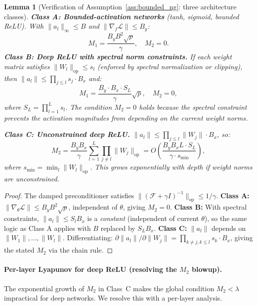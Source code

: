 \documentclass{article}
\providecommand{\FIM}{\mathcal{F}}
\providecommand{\norm}[1]{\lVert #1 \rVert}
\theoremstyle{plain}
\newtheorem{lemma}{Lemma}
\theoremstyle{definition}
\theoremstyle{remark}
\begin{document}
\begin{lemma}[Verification of Assumption~\ref{ass:bounded_ng}: three architecture classes]
\label{lem:verify}
\textbf{Class A: Bounded-activation networks} (tanh, sigmoid, bounded ReLU). With $\norm{a_l}_\infty \leq B$ and $\norm{\nabla_f\mathcal{L}} \leq B_y$:
\begin{equation}
    M_1 = \frac{B_y B^2 \sqrt{p}}{\gamma}, \quad M_2 = 0.
\end{equation}
\textbf{Class B: Deep ReLU with spectral norm constraints.} If each weight matrix satisfies $\norm{W_l}_{\mathrm{op}} \leq s_l$ (enforced by spectral normalization or clipping), then $\norm{a_l} \leq \prod_{j \leq l} s_j \cdot B_x$ and:
\begin{equation}
    M_1 = \frac{B_y \cdot B_x \cdot S_L}{\gamma}\sqrt{p}, \quad M_2 = 0,
\end{equation}
where $S_L = \prod_{l=1}^L s_l$. The condition $M_2 = 0$ holds because the spectral constraint prevents the activation magnitudes from depending on the \emph{current} weight norms.

\textbf{Class C: Unconstrained deep ReLU.} $\norm{a_l} \leq \prod_{j \leq l}\norm{W_j}\cdot B_x$, so:
\begin{equation}
    M_2 = \frac{B_y B_x}{\gamma}\sum_{l=1}^L \prod_{j \neq l}\norm{W_j}_{\mathrm{op}} = O\!\left(\frac{B_y B_x L \cdot S_L}{\gamma \cdot s_{\min}}\right),
\end{equation}
where $s_{\min} = \min_l \norm{W_l}_{\mathrm{op}}$. This grows exponentially with depth if weight norms are unconstrained.
\end{lemma}

\begin{proof}
The damped preconditioner satisfies $\norm{(\FIM + \gamma I)^{-1}}_{\mathrm{op}} \leq 1/\gamma$. \textbf{Class A:} $\norm{\nabla_\theta\mathcal{L}} \leq B_y B^2\sqrt{p}$, independent of $\theta$, giving $M_2 = 0$. \textbf{Class B:} With spectral constraints, $\norm{a_l} \leq S_l B_x$ is a \emph{constant} (independent of current $\theta$), so the same logic as Class A applies with $B$ replaced by $S_L B_x$. \textbf{Class C:} $\norm{a_l}$ depends on $\norm{W_1},\ldots,\norm{W_l}$. Differentiating: $\partial \norm{a_l}/\partial \norm{W_j} = \prod_{k \neq j, k \leq l}s_k \cdot B_x$, giving the stated $M_2$ via the chain rule.
\end{proof}

\paragraph{Per-layer Lyapunov for deep ReLU (resolving the $M_2$ blowup).}
The exponential growth of $M_2$ in Class~C makes the global condition $M_2 < \lambda$ impractical for deep networks. We resolve this with a per-layer analysis.
\end{document}
